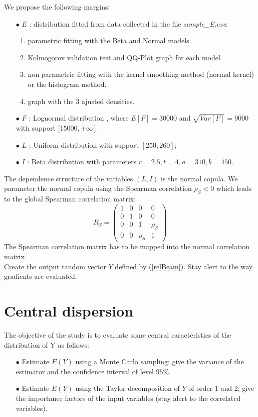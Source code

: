 \documentclass[11pt, french, A4wide]{article}
\theoremstyle{remark}
\theoremstyle{definition}
\begin{document}
We propose the following margins:
\begin{itemize}
  \item[$\bullet$] $E$ : distribution fitted from data collected in the file  \emph{sample\_E.csv}:

  \begin{enumerate}
     \item parametric fitting with the Beta and Normal models.
     \item Kolmogorov validation test and  QQ-Plot graph for each model.
     \item non parametric fitting with the kernel smoothing method (normal kernel) or the histogram method.
     \item graph with the 3 ajusted densities.
   \end{enumerate}

  \item[$\bullet$] $F$ : Lognormal distribution , where $E[F] = 30000$ and $\sqrt{Var[F]} = 9000$ with support $[15000, +\infty[$;
  \item[$\bullet$] $L$ : Uniform distribution with support $[250; 260]$;
  \item[$\bullet$] $I$ : Beta distribution with parameters $r = 2.5,t = 4,a = 310,b = 450$.
\end{itemize}
\vspace*{0.2cm}

The dependence structure of the variables $(L,I)$ is the normal copula. We parameter the normal copula using the Spearman correlation $\rho_S<0$ which leads to the global Spearman correlation matrix:
$$
R_S = \left (
\begin{array}{cccc}
  1 & 0 & 0 & 0 \\
  0 & 1 & 0 & 0 \\
  0 & 0 & 1 & \rho_S \\
  0 & 0 & \rho_S & 1
\end{array}
\right)
$$
The Spearman correlation matrix has to be mapped into the normal correlation matrix.\\

Create the output random vector $Y$ defined by (\ref{relBeam}). Stay alert to the way gradients are evaluated.


\section{Central dispersion}

The objective of the study is to evaluate some central caracteristics of the distribution of Y as follows:
\begin{itemize}
 \item[$\bullet$] Estimate $E(Y)$ using a Monte Carlo sampling: give the variance of the estimator and the confidence interval of level $95 \%$.
 \item[$\bullet$] Estimate $E(Y)$ using the Taylor decomposition of $Y$ of order 1 and 2; give the importance factors of the input variables (stay alert to the correlated variables).
 \end{itemize}
\vspace*{0.2cm}
\end{document}
